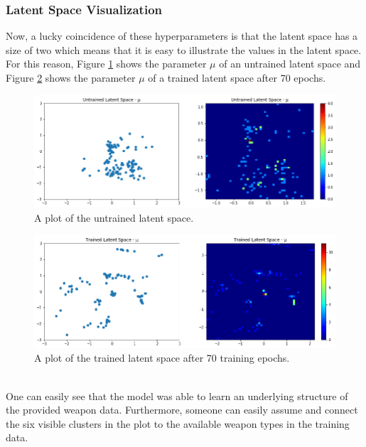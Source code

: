 \documentclass[MGS,Master,english]{twbook}%
\begin{document}
\subsubsection{Latent Space Visualization}
Now, a lucky coincidence of these hyperparameters is that the latent space has a size of two which means that it is easy to illustrate the values in the latent space. For this reason, Figure \ref{fig::vae::untrainedLatentSpace} shows the parameter $\mu$ of an untrained latent space and Figure \ref{fig::vae::trainedLatentSpace} shows the parameter $\mu$ of a trained latent space after 70 epochs.
\begin{figure}[!ht]
	\centering
	\includegraphics[width=1.0\linewidth]{PICs/trained_vae/untrained_latent_space}
	\caption{A plot of the untrained latent space.} \label{fig::vae::untrainedLatentSpace}
\end{figure}
\begin{figure}[!ht]
	\centering
	\includegraphics[width=1.0\linewidth]{PICs/trained_vae/trained_latent_space}
	\caption{A plot of the trained latent space after 70 training epochs.} \label{fig::vae::trainedLatentSpace}
\end{figure}\\
One can easily see that the model was able to learn an underlying structure of the provided weapon data. Furthermore, someone can easily assume and connect the six visible clusters in the plot to the available weapon types in the training data.
\end{document}

